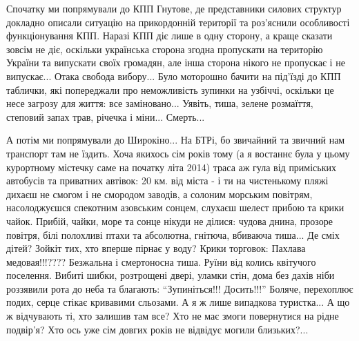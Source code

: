 
Спочатку ми попрямували до КПП Гнутове, де представники силових структур
докладно описали ситуацію на прикордонній території та роз'яснили особливості
функціонування КПП. Наразі КПП діє лише в одну сторону, а краще сказати зовсім
не діє, оскільки українська сторона згодна пропускати на територію України та
випускати своїх громадян, але інша сторона нікого не пропускає і не випускає...
Отака свобода вибору... Було моторошно бачити на під'їзді до КПП таблички, які
попереджали про неможливість зупинки на узбіччі, оскільки це несе загрозу для
життя: все заміновано... Уявіть, тиша, зелене розмаїття, степовий запах трав,
річечка і міни... Смерть... 


А потім ми попрямували до Широкіно... На БТРі, бо звичайний та звичний нам
транспорт там не їздить. Хоча якихось сім років тому (а я востаннє була у цьому
курортному містечку саме на початку літа 2014) траса аж гула від приміських
автобусів та приватних автівок: 20 км. від міста - і ти на чистенькому пляжі
дихаєш не смогом і не смородом заводів, а солоним морським повітрям,
насолоджуєшся спекотним азовським сонцем, слухаєш шелест прибою та крики чайок.
Прибій, чайки, море та сонце нікуди не ділися: чудова днина, прозоре повітря,
білі полохливі птахи та абсолютна, гнітюча, вбиваюча тиша... Де сміх дітей?
Зойкіт тих, хто вперше пірнає у воду? Крики торговок: Пахлава медовая!!!????
Безжальна і смертоносна тиша. Руїни від колись квітучого поселення. Вибиті
шибки, розтрощені двері, уламки стін, дома без дахів ніби роззявили рота до
неба та благають: \enquote{Зупиніться!!! Досить!!!} Боляче, перехоплює подих, серце
стікає кривавими сльозами. А я ж лише випадкова туристка... А що ж відчувають
ті, хто залишив там все? Хто не має змоги повернутися на рідне подвір'я? Хто
ось уже сім довгих років не відвідує могили близьких?... 


